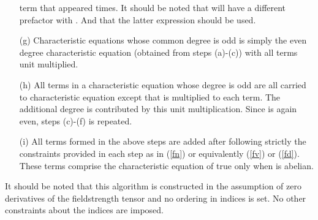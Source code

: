 \documentclass[a4paper,twocolumn]{article}
\begin{document}
\begin{enumerate}
\coordHE{} term that appeared \coordHE{} times. It should be noted that
\coordHE{} will have a different prefactor with \coordHE{}. And that
the latter expression should be used.
\item[(g)]
Characteristic equations whose common degree is odd is simply the
even degree characteristic equation (obtained from steps (a)-(c))
with all terms unit \coordHE{} multiplied.
\item[(h)] All terms in a characteristic equation whose degree \coordHE{} is odd
are all carried to \coordHE{} characteristic equation except that \coordHE{}
is multiplied to each term. The additional degree is contributed
by this unit \coordHE{} multiplication. Since \coordHE{} is again even, steps
(c)-(f) is repeated.
\item[(i)] All terms formed in the above steps are added after following
strictly the constraints provided in each step as in (\ref{fn}) or
equivalently (\ref{fv}) or (\ref{fd}). These terms comprise the
characteristic equation of \coordHE{} true only when \coordHE{} is abelian.
\end{enumerate}
It should be noted that this algorithm is constructed in the
assumption of zero derivatives of the fieldstrength tensor and no
ordering in indices is set. No other constraints about the indices
are imposed.
\end{document}
